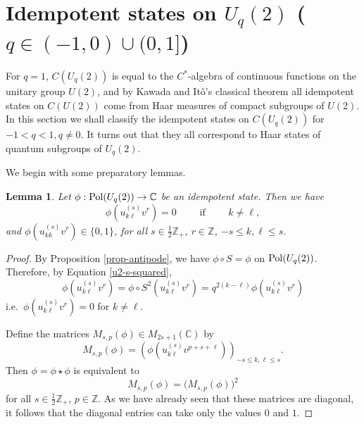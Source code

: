 \documentclass[12pt]{amsart}
\newtheorem{lemma}[theorem]{Lemma}
\theoremstyle{definition}
\theoremstyle{remark}
\numberwithin{equation}{section}
\begin{document}
\section{Idempotent states on $U_q(2)$ ($q\in(-1,0)\cup(0,1]$)}

For $q=1$, $C(U_q(2))$ is equal to the $C^*$-algebra of continuous functions
on the unitary group $U(2)$, and by Kawada and It\^o's classical theorem all
idempotent states on $C(U(2))$ come from Haar measures of compact subgroups of
$U(2)$. In this section we shall classify the idempotent states on $C(U_q(2))$
for $-1<q<1, q \neq 0$. It turns out that they all correspond to Haar
states of quantum subgroups of $U_q(2)$.

We begin with some preparatory lemmas.

\begin{lemma}\label{lem-diag}
Let $\phi:{\rm Pol}(U_q(2))\to\mathbb{C}$ be an idempotent state. Then we have
\[
\phi(u^{(s)}_{k\ell} v^r) = 0 \qquad\mbox{ if } \qquad k\not=\ell,
\]
and $\phi(u^{(s)}_{kk} v^r) \in \{0,1\}$,
for all $s\in\frac{1}{2}\mathbb{Z}_+$, $r\in \mathbb{Z}$, $-s\le k,\ell\le s$.
\end{lemma}
\begin{proof}
By Proposition \ref{prop-antipode}, we have $\phi\circ S=\phi$ on ${\rm
  Pol} (U_q(2))$. Therefore, by Equation \eqref{u2-s-squared},
\[
\phi(u^{(s)}_{k\ell} v^r) = \phi\circ S^2(u^{(s)}_{k\ell} v^r) = q^{2(k-\ell)} \phi(u^{(s)}_{k\ell} v^r)
\]
i.e.\ $\phi(u^{(s)}_{k\ell} v^r)=0$ for $k\not=\ell$.

Define the matrices $M_{s,p}(\phi)\in M_{2s+1}(\mathbb{C})$ by
\[
M_{s,p}(\phi) = \left(\phi(u^{(s)}_{k\ell} v^{p+s+\ell})\right)_{-s\le
  k,\ell\le s}.
\]
Then $\phi=\phi\star\phi$ is equivalent to
\[
M_{s,p}(\phi) = \big(M_{s,p}(\phi)\big)^2
\]
for all $s\in\frac{1}{2}\mathbb{Z}_+$, $p\in \mathbb{Z}$. As we have already
seen that these matrices are diagonal, it follows that the diagonal entries
can take only the values $0$ and $1$.
\end{proof}
\end{document}
